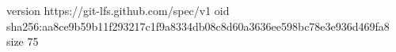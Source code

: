 version https://git-lfs.github.com/spec/v1
oid sha256:aa8ce9b59b11f293217c1f9a8334db08c8d60a3636ee598bc78e3e936d469fa8
size 75
